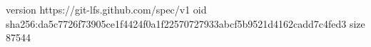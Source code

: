 version https://git-lfs.github.com/spec/v1
oid sha256:da5c7726f73905ce1f4424f0a1f22570727933abcf5b9521d4162cadd7c4fed3
size 87544
